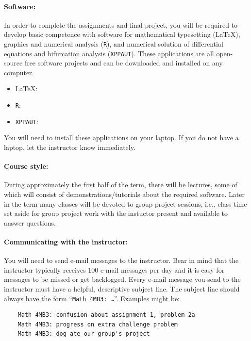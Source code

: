 \documentclass[12pt]{article}
\newcommand{\url}[1]{{\tt\textcolor{blue}{#1}}}
\begin{document}
\paragraph*{Software:} In order to complete the assignments and final project, you will be required to develop basic competence with software for mathematical typesetting (\LaTeX), graphics and numerical analysis ({\tt R}), and numerical solution of differential equations and bifurcation analysis ({\tt XPPAUT}).  These applications are all open-source free software projects and can be downloaded and installed on any computer.
\begin{itemize}\addtolength{\itemsep}{-0.5\baselineskip}
\item \LaTeX:\qquad \url{http://www.latex-project.org/}
\item {\tt R}:\qquad \url{http://www.r-project.org}
\item {\tt XPPAUT}:\qquad \url{http://www.math.pitt.edu/\~bard/xpp/xpp.html}
\end{itemize}
\noindent You will need to install these applications on your laptop.  If you do not have a laptop, let the instructor know immediately.

\paragraph*{Course style:}

During approximately the first half of the term, there will be lectures, some of which will consist of demonstrations/tutorials about the required software.  Later in the term many classes will be devoted to group project sessions, i.e., class time set aside for group project work with the instuctor present and available to answer questions.

\paragraph*{Communicating with the instructor:}

You will need to send e-mail messages to the instructor.  Bear in mind that the instructor typically receives 100 e-mail messages per day and it is easy for messages to be missed or get backlogged.  Every e-mail message you send to the instructor must have a helpful, descriptive subject line.  The subject line should always have the form ``{\tt Math 4MB3: \dots}''.  Examples might be:
\begin{verbatim}
    Math 4MB3: confusion about assignment 1, problem 2a
    Math 4MB3: progress on extra challenge problem
    Math 4MB3: dog ate our group's project
\end{verbatim}
\end{document}

